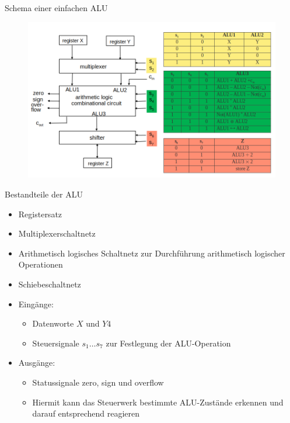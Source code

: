 \documentclass[12pt%
,xcolor=table
,aspectratio=169%
]{beamer}
\begin{document}
\begin{frame}{Schema einer einfachen ALU}
\begin{figure}
\center
\includegraphics[scale=0.4]{pictures/simple_alu}
\end{figure}
\end{frame}

\begin{frame}{Bestandteile der ALU}
\begin{itemize}
	\item Registersatz
	\item Multiplexerschaltnetz
	\item Arithmetisch logisches Schaltnetz zur Durchführung arithmetisch logischer Operationen 
	\item Schiebeschaltnetz
	\item Eingänge:
	\begin{itemize}
		\item Datenworte $X$ und $Y4$
		\item Steuersignale $s_1 \ldots s_7$ zur Festlegung der ALU-Operation
	\end{itemize}
	\item Ausgänge:
	\begin{itemize}
		\item Statussignale zero, sign und overflow
		\item Hiermit kann das Steuerwerk bestimmte ALU-Zustände erkennen und darauf entsprechend reagieren
	\end{itemize}
\end{itemize}
\end{frame}
\end{document}

